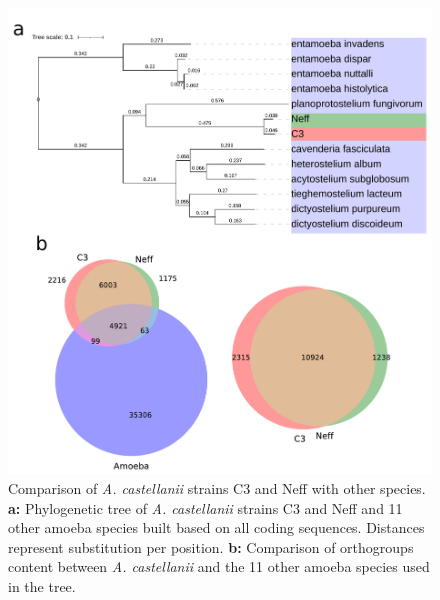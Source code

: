 \begin{figure}[htb]
    \includegraphics[width=\textwidth]{Parts/Part02/gfx/acas_comparative_genomics.pdf}
    \caption[Comparative genomics of \textit{A. castellanii}.]{Comparison of \textit{A. castellanii} strains C3 and Neff with other species. \textbf{a:} Phylogenetic tree of \textit{A. castellanii} strains C3 and Neff and 11 other amoeba species built based on all coding sequences. Distances represent substitution per position. \textbf{b:} Comparison of orthogroups content between \textit{A. castellanii} and the 11 other amoeba species used in the tree.}
    \label{fig:02-02:acas-comp}
\end{figure}

